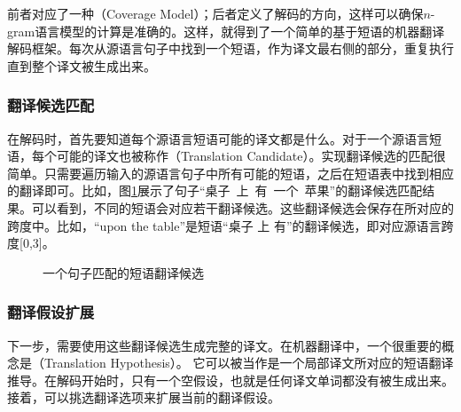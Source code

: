 \parinterval 前者对应了一种{\small{}}（Coverage Model）；后者定义了解码的方向，这样可以确保$n$-gram语言模型的计算是准确的。这样，就得到了一个简单的基于短语的机器翻译解码框架。每次从源语言句子中找到一个短语，作为译文最右侧的部分，重复执行直到整个译文被生成出来。


\subsubsection{翻译候选匹配}

\parinterval 在解码时，首先要知道每个源语言短语可能的译文都是什么。对于一个源语言短语，每个可能的译文也被称作{\small{}}（Translation Candidate）。实现翻译候选的匹配很简单。只需要遍历输入的源语言句子中所有可能的短语，之后在短语表中找到相应的翻译即可。比如，图\ref{fig:4-27}展示了句子``桌子\ 上\ 有\ 一个\ 苹果''的翻译候选匹配结果。可以看到，不同的短语会对应若干翻译候选。这些翻译候选会保存在所对应的跨度中。比如，``upon the table''是短语``桌子 上 有''的翻译候选，即对应源语言跨度[0,3]。

\begin{figure}[htp]
\centering

\caption{一个句子匹配的短语翻译候选}
\label{fig:4-27}
\end{figure}


\subsubsection{翻译假设扩展}

\parinterval 下一步，需要使用这些翻译候选生成完整的译文。在机器翻译中，一个很重要的概念是{\small{}}（Translation Hypothesis）。 它可以被当作是一个局部译文所对应的短语翻译推导。在解码开始时，只有一个空假设，也就是任何译文单词都没有被生成出来。接着，可以挑选翻译选项来扩展当前的翻译假设。

